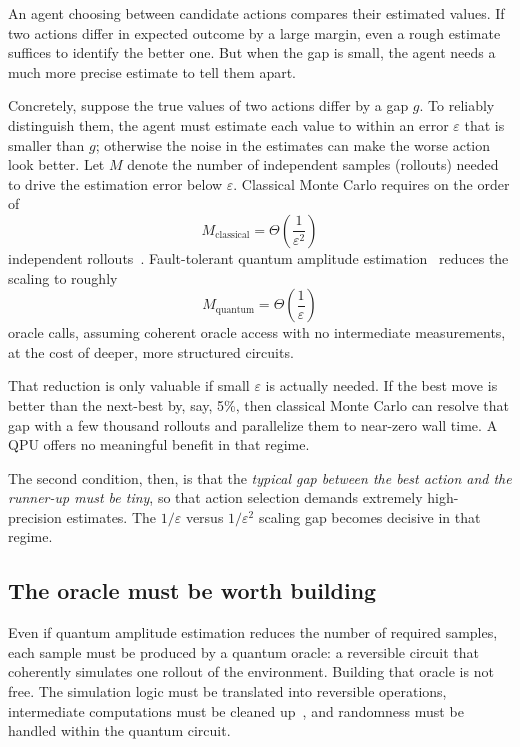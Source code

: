 An agent choosing between candidate actions compares their estimated values.
If two actions differ in expected outcome by a large margin, even a rough estimate suffices to identify the better one.
But when the gap is small, the agent needs a much more precise estimate to tell them apart.

Concretely, suppose the true values of two actions differ by a gap $g$.
To reliably distinguish them, the agent must estimate each value to within an error $\varepsilon$ that is smaller than $g$; otherwise the noise in the estimates can make the worse action look better.
Let $M$ denote the number of independent samples (rollouts) needed to drive the estimation error below $\varepsilon$.
Classical Monte Carlo requires on the order of
\begin{equation}
M_{\text{classical}} = \Theta\!\left(\frac{1}{\varepsilon^2}\right)
\end{equation}
independent rollouts~\cite{azar2013}.
Fault-tolerant quantum amplitude estimation~\cite{brassard2002} reduces the scaling to roughly
\begin{equation}
M_{\text{quantum}} = \Theta\!\left(\frac{1}{\varepsilon}\right)
\end{equation}
oracle calls, assuming coherent oracle access with no intermediate measurements, at the cost of deeper, more structured circuits.

That reduction is only valuable if small $\varepsilon$ is actually needed.
If the best move is better than the next-best by, say, 5\%, then classical Monte Carlo can resolve that gap with a few thousand rollouts and parallelize them to near-zero wall time.
A QPU offers no meaningful benefit in that regime.

The second condition, then, is that the \emph{typical gap between the best action and the runner-up must be tiny}, so that action selection demands extremely high-precision estimates.
The $1/\varepsilon$ versus $1/\varepsilon^2$ scaling gap becomes decisive in that regime.

\subsection{The oracle must be worth building}

Even if quantum amplitude estimation reduces the number of required samples, each sample must be produced by a quantum oracle: a reversible circuit that coherently simulates one rollout of the environment.
Building that oracle is not free.
The simulation logic must be translated into reversible operations, intermediate computations must be cleaned up~\cite{bennett1973}, and randomness must be handled within the quantum circuit.

